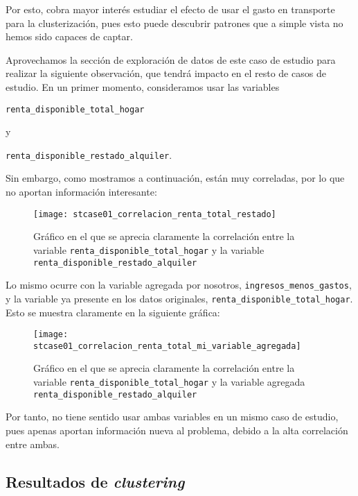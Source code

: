 \documentclass[11pt]{article}
\begin{document}
Por esto, cobra mayor interés estudiar el efecto de usar el gasto en transporte para la clusterización, pues esto puede descubrir patrones que a simple vista no hemos sido capaces de captar.

Aprovechamos la sección de exploración de datos de este caso de estudio para realizar la siguiente observación, que tendrá impacto en el resto de casos de estudio. En un primer momento, consideramos usar las variables

\lstinline{renta_disponible_total_hogar}

y

\lstinline{renta_disponible_restado_alquiler}.

Sin embargo, como mostramos a continuación, están muy correladas, por lo que no aportan información interesante:

\begin{figure}[H]
    \centering

    \texttt{[image: stcase01\_correlacion\_renta\_total\_restado]}
    \caption{Gráfico en el que se aprecia claramente la correlación entre la variable \lstinline{renta_disponible_total_hogar} y la variable \lstinline{renta_disponible_restado_alquiler}}
\end{figure}

Lo mismo ocurre con la variable agregada por nosotros, \lstinline{ingresos_menos_gastos}, y la variable ya presente en los datos originales, \lstinline{renta_disponible_total_hogar}. Esto se muestra claramente en la siguiente gráfica:

\begin{figure}[H]
    \centering

    \texttt{[image: stcase01\_correlacion\_renta\_total\_mi\_variable\_agregada]}
    \caption{Gráfico en el que se aprecia claramente la correlación entre la variable \lstinline{renta_disponible_total_hogar} y la variable agregada \lstinline{renta_disponible_restado_alquiler}}
\end{figure}

Por tanto, no tiene sentido usar ambas variables en un mismo caso de estudio, pues apenas aportan información nueva al problema, debido a la alta correlación entre ambas.

\pagebreak

\subsection{Resultados de \emph{clustering}} \label{stcase01_parametros:seccion}
\end{document}
